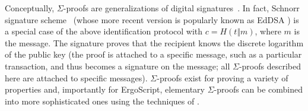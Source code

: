 \documentclass[11pt]{article}
\newcommand{\langname}{ErgoScript\xspace}
\begin{document}
{Conceptually, $\Sigma$-proofs are generalizations of digital signatures~\cite{CL06}.
In fact, Schnorr signature scheme~\cite{Sch91} (whose more recent version is popularly known as EdDSA \cite{BDLSY12,rfc8032}) is a special case of the above identification protocol with $c = H(t \Vert m)$, where $m$ is the message. The signature proves that the recipient knows the discrete logarithm of the public key (the proof is attached to a specific message, such as a particular transaction, and thus becomes a signature on the message; all $\Sigma$-proofs described here are attached to specific messages). $\Sigma$-proofs exist for proving a variety of properties and, importantly for \langname, elementary $\Sigma$-proofs can be combined into more sophisticated ones using the techniques of \cite{CDS94}. 
}

 
\end{document}
